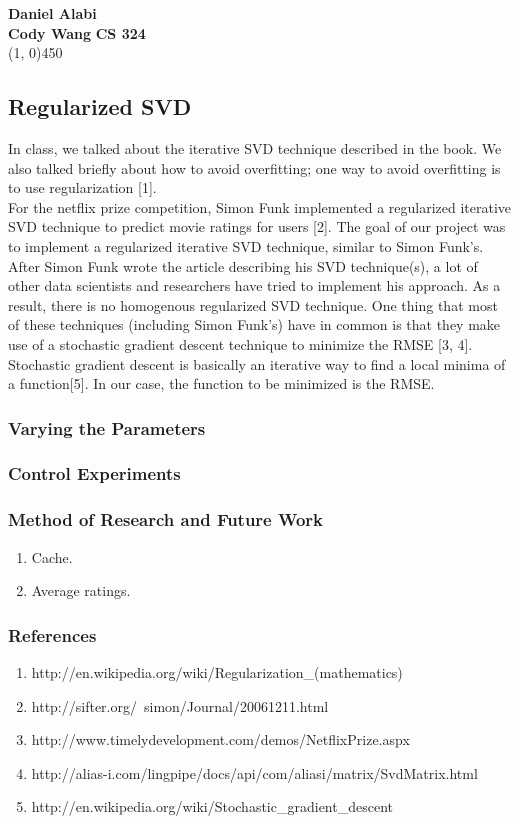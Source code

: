 \documentclass[12pt]{article}
\begin{document}
\noindent \textbf{Daniel Alabi} \\
\textbf{Cody Wang}
\hfill
\textbf{CS 324}\\
\line(1, 0){450} 

\subsection*{Regularized SVD}

In class, we talked about the iterative SVD technique described in the book.
We also talked briefly about how to avoid overfitting; one way to avoid
overfitting is to use regularization [1]. \\

\noindent For the netflix prize competition, Simon Funk implemented a regularized 
iterative SVD technique to predict movie ratings for users [2]. The goal of our
project was to implement a regularized iterative SVD technique, similar
to Simon Funk's. After Simon Funk wrote the article describing his
SVD technique(s), a lot of other data scientists and researchers
have tried to implement his approach. As a result, there is no homogenous
regularized SVD technique. One thing that most of these techniques (including
Simon Funk's) have in common is that they make use of a stochastic 
gradient descent technique to minimize the RMSE [3, 4]. Stochastic gradient 
descent is basically an iterative way to find a local minima of a function[5]. In our
case, the function to be minimized is the RMSE.




\subsubsection*{Varying the Parameters}

\subsubsection*{Control Experiments}

\subsubsection*{Method of Research and Future Work}
\begin{enumerate}
\item Cache.
\item Average ratings.
\end{enumerate}

\subsubsection*{References}
\begin{enumerate}
  \item http://en.wikipedia.org/wiki/Regularization\_(mathematics)
  \item http://sifter.org/~simon/Journal/20061211.html
  \item http://www.timelydevelopment.com/demos/NetflixPrize.aspx
  \item http://alias-i.com/lingpipe/docs/api/com/aliasi/matrix/SvdMatrix.html
  \item http://en.wikipedia.org/wiki/Stochastic_gradient_descent
\end{enumerate}
\end{document}
